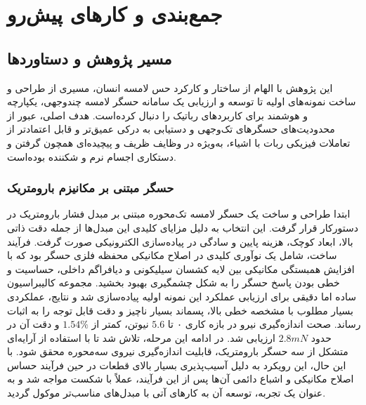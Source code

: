 \chapter{جمع‌بندی و کارهای پیش‌رو}
\section{مسیر پژوهش و دستاورد‌‌ها}
این پژوهش با الهام از ساختار و کارکرد حس لامسه انسان، مسیری از طراحی و ساخت نمونه‌های اولیه تا توسعه و ارزیابی یک سامانه حسگر لامسه‌ چندوجهی، یکپارچه و هوشمند برای کاربردهای رباتیک را دنبال کرده‌است. هدف اصلی، عبور از محدودیت‌های حسگرهای تک‌وجهی و دستیابی به درکی عمیق‌تر و قابل اعتمادتر از تعاملات فیزیکی ربات با اشیاء، به‌ویژه در وظایف ظریف و پیچیده‌ای همچون گرفتن و دستکاری اجسام نرم و شکننده بوده‌است.

\subsection{حسگر مبتنی بر مکانیزم بارومتریک}

ابتدا طراحی و ساخت یک حسگر لامسه تک‌‌محوره مبتنی بر مبدل فشار بارومتریک  در دستورکار قرار گرفت. این انتخاب به دلیل مزایای کلیدی این مبدل‌ها از جمله دقت ذاتی بالا، ابعاد کوچک، هزینه پایین و سادگی در پیاده‌سازی الکترونیکی صورت گرفت. فرآیند ساخت، شامل یک نوآوری کلیدی در اصلاح مکانیکی محفظه فلزی حسگر بود که با افزایش همبستگی مکانیکی بین لایه کشسان سیلیکونی و دیافراگم داخلی، حساسیت و خطی بودن پاسخ حسگر را به شکل چشمگیری بهبود بخشید. مجموعه کالیبراسیون ساده اما دقیقی برای ارزیابی عملکرد این نمونه اولیه پیاده‌سازی شد و نتایج، عملکردی بسیار مطلوب با مشخصه خطی بالا، پسماند بسیار ناچیز و دقت قابل توجه را به اثبات رساند. صحت اندازه‌گیری نیرو در بازه کاری ۰ تا $5.6$ نیوتن، کمتر از $1.54\%$ و دقت آن در حدود $2.8mN$ ارزیابی شد\cite{sheykh2025Design}. 
 در ادامه این مرحله، تلاش شد تا با استفاده از آرایه‌ای متشکل از سه حسگر بارومتریک، قابلیت اندازه‌گیری نیروی سه‌محوره محقق شود. با این حال، این رویکرد به دلیل آسیب‌پذیری بسیار بالای قطعات در حین فرآیند حساس اصلاح مکانیکی و اشباع دائمی آن‌ها پس از این فرآیند، عملاً با شکست مواجه شد و به عنوان یک تجربه، توسعه آن به کارهای آتی با مبدل‌های مناسب‌‌تر موکول گردید.


